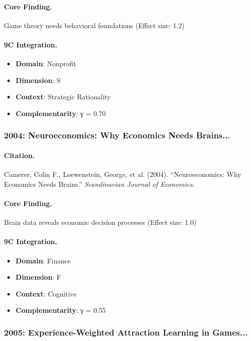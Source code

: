 \paragraph{Core Finding.}
Game theory needs behavioral foundations (Effect size: 1.2)

\paragraph{9C Integration.}
\begin{itemize}[nosep]
  \item \textbf{Domain}: Nonprofit
  \item \textbf{Dimension}: S
  \item \textbf{Context}: Strategic Rationality
  \item \textbf{Complementarity}: γ = 0.70
\end{itemize}

\subsubsection{2004: Neuroeconomics: Why Economics Needs Brains...}

\paragraph{Citation.}
Camerer, Colin F., Loewenstein, George, et al. (2004). ``Neuroeconomics: Why Economics Needs Brains.''
\textit{Scandinavian Journal of Economics}.

\paragraph{Core Finding.}
Brain data reveals economic decision processes (Effect size: 1.0)

\paragraph{9C Integration.}
\begin{itemize}[nosep]
  \item \textbf{Domain}: Finance
  \item \textbf{Dimension}: F
  \item \textbf{Context}: Cognitive
  \item \textbf{Complementarity}: γ = 0.55
\end{itemize}

\subsubsection{2005: Experience-Weighted Attraction Learning in Games...}

